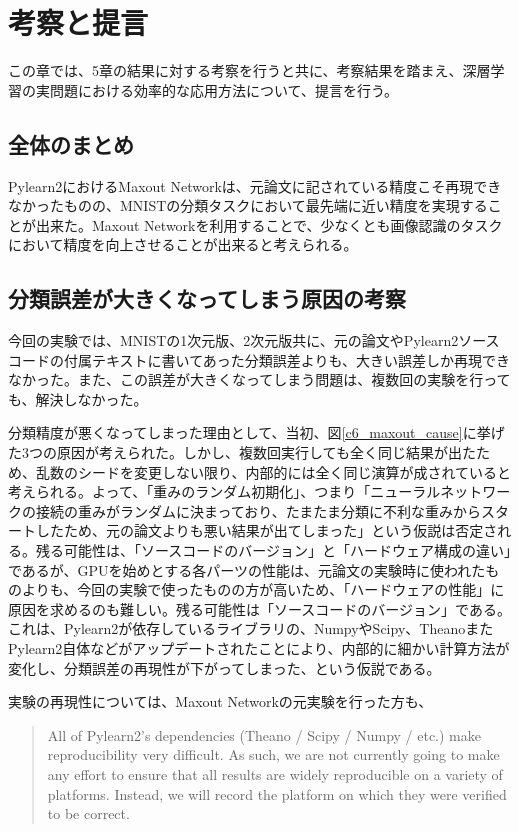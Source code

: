 \chapter{考察と提言}
この章では、5章の結果に対する考察を行うと共に、考察結果を踏まえ、深層学習の実問題における効率的な応用方法について、提言を行う。

\section{全体のまとめ}
Pylearn2におけるMaxout Networkは、元論文に記されている精度こそ再現できなかったものの、MNISTの分類タスクにおいて最先端に近い精度を実現することが出来た。Maxout Networkを利用することで、少なくとも画像認識のタスクにおいて精度を向上させることが出来ると考えられる。\par
\section{分類誤差が大きくなってしまう原因の考察}
今回の実験では、MNISTの1次元版、2次元版共に、元の論文やPylearn2ソースコードの付属テキストに書いてあった分類誤差よりも、大きい誤差しか再現できなかった。また、この誤差が大きくなってしまう問題は、複数回の実験を行っても、解決しなかった。\par
分類精度が悪くなってしまった理由として、当初、図\ref{c6_maxout_cause}に挙げた3つの原因が考えられた。しかし、複数回実行しても全く同じ結果が出たため、乱数のシードを変更しない限り、内部的には全く同じ演算が成されていると考えられる。よって、「重みのランダム初期化」、つまり「ニューラルネットワークの接続の重みがランダムに決まっており、たまたま分類に不利な重みからスタートしたため、元の論文よりも悪い結果が出てしまった」という仮説は否定される。残る可能性は、「ソースコードのバージョン」と「ハードウェア構成の違い」であるが、GPUを始めとする各パーツの性能は、元論文の実験時に使われたものよりも、今回の実験で使ったものの方が高いため、「ハードウェアの性能」に原因を求めるのも難しい。残る可能性は「ソースコードのバージョン」である。これは、Pylearn2が依存しているライブラリの、NumpyやScipy、TheanoまたPylearn2自体などがアップデートされたことにより、内部的に細かい計算方法が変化し、分類誤差の再現性が下がってしまった、という仮説である。\par
実験の再現性については、Maxout Networkの元実験を行った方も、
\begin{quote}
All of Pylearn2's dependencies (Theano / Scipy / Numpy / etc.) make reproducibility
very difficult. As such, we are not currently going to make any effort to ensure that
all results are widely reproducible on a variety of platforms. Instead, we will
record the platform on which they were verified to be correct.
\end{quote}
